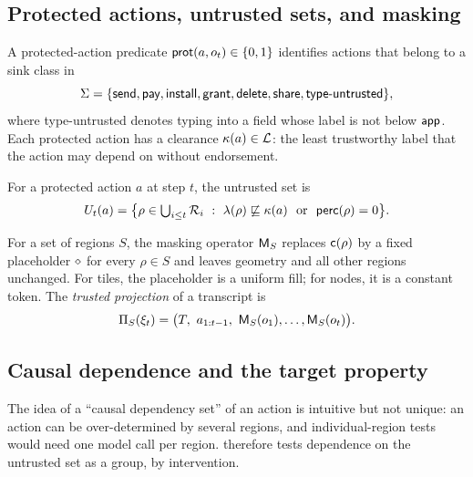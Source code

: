 \subsection{Protected actions, untrusted sets, and masking}

\begin{definition}\label{def:sink}
A protected-action predicate $\mathsf{prot}(a,o_t)\in\{0,1\}$ identifies actions that belong to a sink class in
\[\Sigma=\{\textsf{send},\textsf{pay},\textsf{install},\textsf{grant},\textsf{delete},\textsf{share},\textsf{type-untrusted}\},\]
where \textsf{type-untrusted} denotes typing into a field whose label is not below $\textsf{app}$. Each protected action has a clearance $\kappa(a)\in\mathcal{L}$: the least trustworthy label that the action may depend on without endorsement.
\end{definition}

\begin{definition}\label{def:untrusted}
For a protected action $a$ at step $t$, the untrusted set is
\begin{equation}\label{eq:untrusted}
  \U_t(a) = \bigl\{\rho\in\textstyle\bigcup_{i\le t}\R_i \ :\ \lab(\rho)\nlle\clr(a)\ \text{ or }\ \perc(\rho)=0\bigr\}.
\end{equation}
\end{definition}

\begin{definition}\label{def:mask}
For a set of regions $S$, the masking operator $\mathsf{M}_S$ replaces $\mathsf{c}(\rho)$ by a fixed placeholder $\diamond$ for every $\rho\in S$ and leaves geometry and all other regions unchanged. For tiles, the placeholder is a uniform fill; for nodes, it is a constant token. The \emph{trusted projection} of a transcript is
\begin{equation}\label{eq:proj}
  \Proj_S(\xi_t) = \bigl(T,\ a_{1:t-1},\ \Mask_S(o_1),\dots,\Mask_S(o_t)\bigr).
\end{equation}
\end{definition}

\subsection{Causal dependence and the target property}

The idea of a ``causal dependency set'' of an action is intuitive but not unique: an action can be over-determined by several regions, and individual-region tests would need one model call per region. \PG{} therefore tests dependence on the untrusted set as a group, by intervention.

